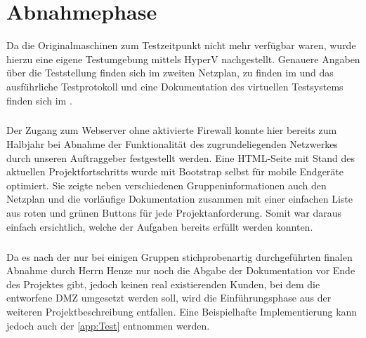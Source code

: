 \section{Abnahmephase} 
\label{sec:Abnahmephase}
Da die Originalmaschinen zum Testzeitpunkt nicht mehr verfügbar waren, wurde hierzu eine eigene Testumgebung mittels HyperV nachgestellt. Genauere Angaben über die Teststellung finden sich im zweiten Netzplan, zu finden im  und das ausführliche Testprotokoll und eine Dokumentation des virtuellen Testsystems finden sich im .
\subparagraph*{} Der Zugang zum Webserver ohne aktivierte Firewall konnte hier bereits zum Halbjahr bei Abnahme der Funktionalität des zugrundeliegenden Netzwerkes durch unseren Auftraggeber festgestellt werden. Eine HTML-Seite mit Stand des aktuellen Projektfortschritts wurde mit Bootstrap selbst für mobile Endgeräte optimiert. Sie zeigte neben verschiedenen Gruppeninformationen auch den Netzplan und die vorläufige Dokumentation zusammen mit einer einfachen Liste aus roten und grünen Buttons für jede Projektanforderung. Somit war daraus einfach ersichtlich, welche der Aufgaben bereits erfüllt werden konnten.
\subparagraph*{} Da es nach der nur bei einigen Gruppen stichprobenartig durchgeführten finalen Abnahme durch Herrn Henze nur noch die Abgabe der Dokumentation vor Ende des Projektes gibt, jedoch keinen real existierenden Kunden, bei dem die entworfene DMZ umgesetzt werden soll, wird die Einführungsphase aus der weiteren Projektbeschreibung entfallen. Eine Beispielhafte Implementierung kann jedoch auch der \ref{app:Test} entnommen werden.

